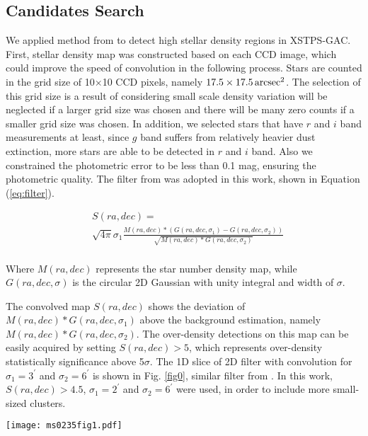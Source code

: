 \documentclass[]{raa_rb}
\begin{document}
\subsection{Candidates Search}
We applied method from \cite{Koposov2008} to detect high stellar density regions in XSTPS-GAC. 
First, stellar density map was constructed based on each CCD image,  
which could improve the speed of convolution in the following process. Stars are counted in the grid size of 10$\times$10 CCD pixels, namely $\rm 17.5\times17.5\,arcsec^{2}$. The selection of this grid size is a result of considering small scale density variation will be neglected if a larger grid size was chosen and there will be many zero counts if a smaller grid size was chosen. 
In addition, we selected stars that have $r$ and $i$ band measurements at least, since $g$ band suffers from relatively heavier dust extinction, more stars are able to be detected in $r$ and $i$ band. Also we constrained the photometric error to be less than 0.1 mag, ensuring the photometric quality. The filter from \cite{Koposov2008} was adopted in this work, shown in Equation (\ref{eq:filter}). 

\begin{equation}
\label{eq:filter}
\begin{aligned}
& S(ra,dec)  =  \\
& \sqrt{4\pi }{\sigma}_{1}\frac{M(ra,dec)*(G(ra,dec,{\sigma}_{1})-G(ra,dec,{\sigma}_{2}))}{\sqrt{M(ra,dec)*G(ra,dec,{\sigma}_{2})}}\\
\end{aligned} 
\end{equation}

Where $M(ra,dec)$ represents the star number density map, while $G(ra,dec,\sigma)$ is the circular 2D Gaussian with unity integral and width of $\sigma$. 

The convolved map $S(ra,dec)$ shows the deviation of $M(ra,dec)*G(ra,dec,{\sigma}_{1})$ above the background estimation, namely $M(ra,dec)*G(ra,dec,{\sigma}_{2})$. The over-density detections on this map can be easily acquired by setting $S(ra,dec) > 5$, which represents over-density statistically significance above 5$\sigma$. The 1D slice of 2D filter with convolution for $\sigma_{1} = 3^{\prime}$ and $\sigma_{2} = 6^{\prime}$ is shown in Fig. \ref{fig0}, similar filter from \cite{Koposov2008}. In this work, $S(ra,dec)>4.5$, $\sigma_{1} = 2^{\prime}$ and $\sigma_{2} = 6^{\prime}$ were used, in order to include more small-sized clusters.

 \begin{figure*}
 \begin{center}
 \texttt{[image: ms0235fig1.pdf]}
 \caption{The $Koposov$ method adopted to search for the over-density area. The left panel is the stellar number density map based on data from XSTPS-GAC. Constructed $Koposov$ filter is shown in the middle panel. The right panel shows the stellar number density map after convolution. The over-density area is more evident.} 
 \label{fig0}
 \end{center}
 \end{figure*}
\end{document}
